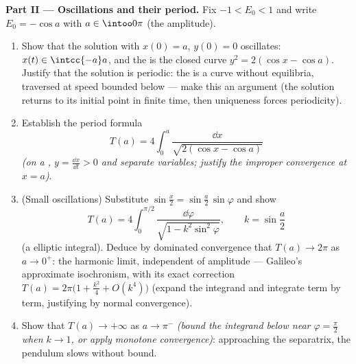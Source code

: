 \begin{problem}
\medskip
\noindent\textbf{Part II --- Oscillations and their period.}
Fix $-1 < E_0 < 1$ and write $E_0 = -\cos a$ with $a \in
\intoo0\pi$ (the amplitude).
\begin{enumerate}[resume]
  \item Show that the solution with $x(0) = a$, $y(0) = 0$
        oscillates: $x(t) \in \intcc{-a}a$, and the  is
        the closed curve $y^2 = 2(\cos x - \cos a)$. Justify
        that the solution is periodic: the  is a 
        curve without equilibria, traversed at speed bounded
        below --- make this an argument (the solution returns
        to its initial point in finite time, then uniqueness
        forces periodicity).
  \item Establish the period formula
        \[
        T(a) = 4\int_0^{a}\frac{\dd x}{\sqrt{2(\cos x -
        \cos a)}}
        \]
        \emph{(on a , $y = \frac{\dd x}{\dd t} >
        0$ and separate variables; justify the improper
        convergence at $x = a$)}.
  \item (Small oscillations) Substitute $\sin\frac x2 =
        \sin\frac a2\,\sin\varphi$ and show
        \[
        T(a) = 4\int_0^{\pi/2}\frac{\dd\varphi}{\sqrt{1 -
        k^2\sin^2\varphi}},
        \qquad k = \sin\frac a2
        \]
        (a  elliptic integral). Deduce by dominated
        convergence that $T(a) \to 2\pi$ as $a \to 0^+$: the
        harmonic limit, independent of amplitude ---
        Galileo's approximate isochronism, with its exact
        correction $T(a) = 2\pi\bigl(1 + \frac{k^2}4 +
        O(k^4)\bigr)$ (expand the integrand and integrate
        term by term, justifying by normal convergence).
  \item Show that $T(a) \to +\infty$ as $a \to \pi^-$
        \emph{(bound the integrand below near $\varphi =
        \frac\pi2$ when $k \to 1$, or apply monotone
        convergence)}: approaching the separatrix, the
        pendulum slows without bound.
\end{enumerate}


\end{problem}
